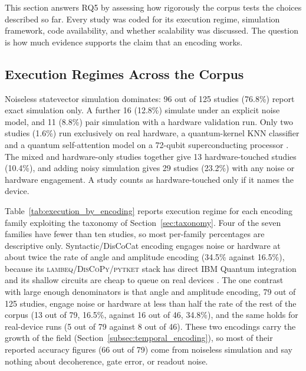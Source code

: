 \documentclass{ieeeaccess}
\begin{document}
This section answers RQ5 by assessing how rigorously the corpus tests the choices described so far. Every study was coded for its execution regime, simulation framework, code availability, and whether scalability was discussed. The question is how much evidence supports the claim that an encoding works.

\subsection{Execution Regimes Across the Corpus}
\label{subsec:execution_regimes}

Noiseless statevector simulation dominates: 96 out of 125 studies (76.8\%) report exact simulation only. A further 16 (12.8\%) simulate under an explicit noise model, and 11 (8.8\%) pair simulation with a hardware validation run. Only two studies (1.6\%) run exclusively on real hardware, a quantum-kernel KNN classifier \cite{zeguendry_quantum_2024} and a quantum self-attention model on a 72-qubit superconducting processor \cite{he_training_2024}. The mixed and hardware-only studies together give 13 hardware-touched studies (10.4\%), and adding noisy simulation gives 29 studies (23.2\%) with any noise or hardware engagement. A study counts as hardware-touched only if it names the device.

Table~\ref{tab:execution_by_encoding} reports execution regime for each encoding family exploiting the taxonomy of Section~\ref{sec:taxonomy}. Four of the seven families have fewer than ten studies, so most per-family percentages are descriptive only. Syntactic/DisCoCat encoding engages noise or hardware at about twice the rate of angle and amplitude encoding (34.5\% against 16.5\%), because its \textsc{lambeq}/\textsc{DisCoPy}/\textsc{pytket} stack has direct IBM Quantum integration and its shallow circuits are cheap to queue on real devices \cite{lorenz_qnlp_2023,meichanetzidis_grammar-aware_2023,peral-garcia_comparing_2024,miranda_quantum_2022}. The one contrast with large enough denominators is that angle and amplitude encoding, 79 out of 125 studies, engage noise or hardware at less than half the rate of the rest of the corpus (13 out of 79, 16.5\%, against 16 out of 46, 34.8\%), and the same holds for real-device runs (5 out of 79 against 8 out of 46). These two encodings carry the growth of the field (Section~\ref{subsec:temporal_encoding}), so most of their reported accuracy figures (66 out of 79) come from noiseless simulation and say nothing about decoherence, gate error, or readout noise.
\end{document}
